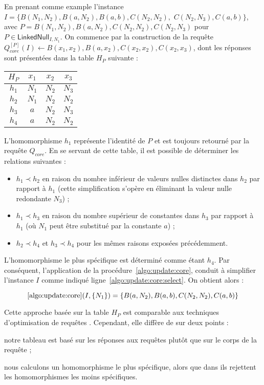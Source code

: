 \begin{example}
	En prenant comme example l'instance $I = \{B(N_1, N_2), B(a, N_2), B(a, b), C(N_2, N_2),$ $C(N_2, N_3), C(a, b)\}$, avec $P = {B(N_1, N_2), B(a, N_2), C(N_2, N_2), C(N_2, N_3)}$ pour $P \in \textsf{LinkedNull}_{I,N_1}$.
	On commence par la construction de la requête $Q_{core}^{[P]}(I) \gets B(x_1, x_2), B(a, x_2), C(x_2, x_2), C(x_2, x_3)$, dont les réponses sont présentées dans la table $H_P$ suivante :

	\begin{center}
		\begin{tabular}{c|ccc}
			$H_P$ & $x_1$ & $x_2$ & $x_3$ \\
			\hline
			$h_1$ & $N_1$ & $N_2$ & $N_3$ \\
			$h_2$ & $N_1$ & $N_2$ & $N_2$ \\
			$h_3$ & $a$   & $N_2$ & $N_3$ \\
			$h_4$ & $a$   & $N_2$ & $N_2$ \\
		\end{tabular}
	\end{center}

	L'homomorphisme $h_1$ représente l'identité de $P$ et est toujours retourné par la requête $Q_{core}$.
	En se servant de cette table, il est possible de déterminer les relations suivantes :

	\begin{itemize}
		\item $h_1 \prec h_2$ en raison du nombre inférieur de valeurs nulles distinctes dans $h_2$ par rapport à $h_1$ (cette simplification s'opère en éliminant la valeur nulle redondante $N_3$) ;
		\item $h_1 \prec h_3$ en raison du nombre supérieur de constantes dans $h_3$ par rapport à $h_1$ (où $N_1$ peut être substitué par la constante $a$) ;
		\item $h_2 \prec h_4$ et $h_3 \prec h_4$ pour les mêmes raisons exposées précédemment.
	\end{itemize}

	L'homomorphisme le plus spécifique est déterminé comme étant $h_4$.
	Par conséquent, l'application de la procédure~\ref{algo:update:core}, conduit à simplifier l'instance $I$ comme indiqué ligne~\ref{algo:update:core:select}. On obtient alors :

	\[
		\ref{algo:update:core}(I, \{N_1\}) = \{B(a, N_2), B(a, b), C(N_2, N_2), C(a, b)\}
	\]
\end{example}

Cette approche basée sur la table $H_P $ est comparable aux techniques d'optimisation de requêtes \cite{chandraOptimalImplementationConjunctive1977}.
Cependant, elle diffère de \cite{ahoEfficientOptimizationClass1979,chandraOptimalImplementationConjunctive1977} sur deux points :
\begin{enumerate*}[label=(\roman*)]
	\item notre tableau est basé sur les réponses aux requêtes plutôt que sur le corps de la requête ;
	\item nous calculons un homomorphisme le plus spécifique, alors que dans \cite{ahoEfficientOptimizationClass1979} ils rejettent les homomorphismes les moins spécifiques.
\end{enumerate*}
